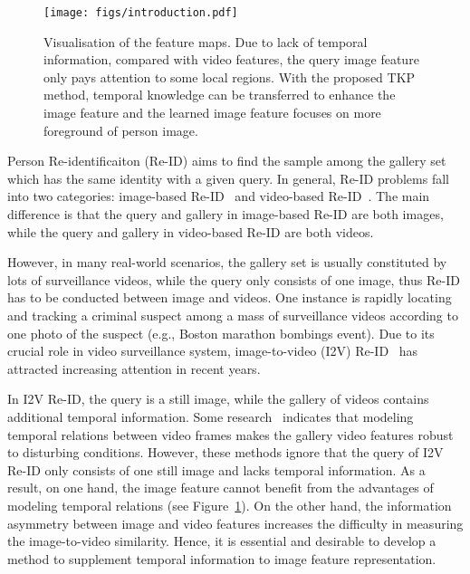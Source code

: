\documentclass[10pt,twocolumn,letterpaper]{article}
\begin{document}
\begin{figure}
	\centering
	\texttt{[image: figs/introduction.pdf]}\\
	\vspace{-5pt}
	\caption{Visualisation of the feature maps. Due to lack of temporal information, compared with video features, the query image feature only pays attention to some local regions.
	With the proposed TKP method, temporal knowledge can be transferred to enhance the image feature and the learned image feature focuses on more foreground of person image.}
	\vspace{-15pt}
	\label{fig:introduction}
\end{figure}

Person Re-identificaiton (Re-ID) aims to find the sample among the gallery set which has the same identity with a given query.
In general, Re-ID problems fall into two categories: image-based Re-ID~\cite{Bai2017Scalable,Yu2018Hard,Hou2019Interaction,Ge2018Deep} and video-based Re-ID~\cite{Wu2018One,Wang2014Person,Hou2019vrstc}.
The main difference is that the query and gallery in image-based Re-ID are both images, while the query and gallery in video-based Re-ID are both videos.

However, in many real-world scenarios, the gallery set is usually constituted by lots of surveillance videos, while the query only consists of one image, thus Re-ID has to be conducted between image and videos.
One instance is rapidly locating and tracking a criminal suspect among a mass of surveillance videos according to one photo of the suspect (e.g., Boston marathon bombings event).
Due to its crucial role in video surveillance system, image-to-video (I2V) Re-ID~\cite{Zhu2017Learning,Zhu2018Image} has attracted increasing attention in recent years.

In I2V Re-ID, the query is a still image, while the gallery of videos contains additional temporal information.
Some research~\cite{Zhang2017Image,Zhu2017Learning} indicates that modeling temporal relations between video frames makes the gallery video features robust to disturbing conditions.
However, these methods ignore that the query of I2V Re-ID only consists of one still image and lacks temporal information.
As a result, on one hand, the image feature cannot benefit from the advantages of modeling temporal relations (see Figure~\ref{fig:introduction}).
On the other hand, the information asymmetry between image and video features increases the difficulty in measuring the image-to-video similarity.
Hence, it is essential and desirable to develop a method to supplement temporal information to image feature representation.
\end{document}
